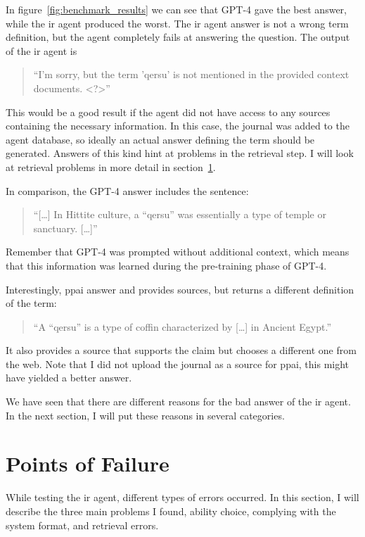 \documentclass[../main.tex]{subfiles}
\begin{document}
In figure~\ref{fig:benchmark_results} we can see that GPT-4 gave the best answer,
while the \gls{ir} agent produced the worst.
The \gls{ir} agent answer is not a wrong term definition,
but the agent completely fails at answering the question.
The output of the \gls{ir} agent is
\begin{quote}
      ``I'm sorry, but the term 'qersu' is not mentioned in the provided context documents. <?>''
\end{quote}
This would be a good result if the agent did not have access to any sources
containing the necessary information.
In this case, the journal was added to the agent database, so ideally an actual
answer defining the term should be generated.
Answers of this kind hint at problems in the retrieval step.
I will look at retrieval problems in more detail in section~\ref{sec:pof}.

In comparison, the GPT-4 answer includes the sentence:
\begin{quote}
      ``[\dots] In Hittite culture, \textcolor{emph blue}{a ``qersu'' was}
      essentially \textcolor{emph blue}{a type of temple or sanctuary}. [\dots]''
\end{quote}
Remember that GPT-4 was prompted without additional context,
which means that this information was learned during the pre-training phase of GPT-4.

Interestingly, \gls{ppai} answer and provides sources,
but returns a different definition of the term:
\begin{quote}
      ``A ``qersu'' is a type of coffin characterized by [\dots] in Ancient Egypt.''
\end{quote}
It also provides a source that supports the claim but chooses a different one
from the web.
Note that I did not upload the journal as a source for \gls{ppai}, this might
have yielded a better answer.

We have seen that there are different reasons for the bad answer of the \gls{ir} agent.
In the next section, I will put these reasons in several categories.

\section{Points of Failure}
\label{sec:pof}

While testing the \gls{ir} agent, different types of errors occurred.
In this section, I will describe the three main problems I found, ability choice,
complying with the system format, and retrieval errors.
\end{document}
